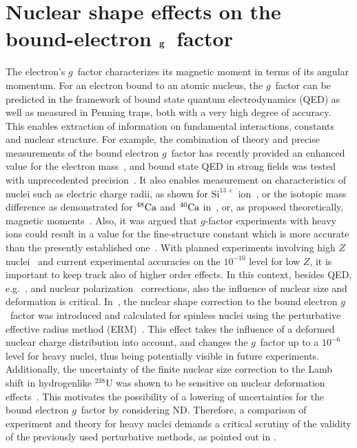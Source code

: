 \chapter{Nuclear shape effects on the bound-electron $\bf{g}$~factor}
\label{ch:nucl_def}
The electron's $g$~factor characterizes its magnetic moment in terms of its angular momentum. For an electron bound to an atomic nucleus, the $g$~factor can be predicted in the framework of bound state quantum electrodynamics (QED) as well as measured in Penning traps, both with a very high degree of accuracy. This enables extraction of information on fundamental interactions, constants and nuclear structure. For example, the combination of theory and precise measurements of the bound electron $g$~factor has recently provided an enhanced value for the electron mass~\cite{Sturm2014}, and bound state QED in strong fields was tested with unprecedented precision~\cite{Haffner2000, Verdu2004, Kohler2015, Zatorski2017}. It also enables measurement on characteristics of nuclei such as electric charge radii, as shown for $\textrm{Si}^{13+}$ ion~\cite{Sturm2011}, or the isotopic mass difference as demonstrated for $\null^{48} \textrm{Ca}$ and $\null^{40} \textrm{Ca}$ in~\cite{Kohler2016}, or, as proposed theoretically, magnetic moments~\cite{Yerokhin2011}.  Also, it was argued that $g$-factor experiments with heavy ions could result in a value for the fine-structure constant which is more accurate than the presently established one~\cite{Shabaev2006}.
With planned experiments involving high $Z$ nuclei~\cite{HITRAP2008,vogel2015} and current experimental accuracies on the $10^{-10}$ level for low $Z$, it is important to keep track also of higher order effects. In this context, besides QED, e.g.~\cite{Yerokhin2004,yerokhin2017,Pachucki2005, czarnecki2016,czarnecki2018}, and nuclear polarization~\cite{Nefiodov} corrections, also the influence of nuclear size and deformation is critical.
In~\cite{jacek2012}, the nuclear shape correction to the bound electron $g$~factor was introduced and calculated for spinless nuclei using the perturbative effective radius method (ERM)~\cite{Shabaev1993,kozhedub2008}. This effect takes the influence of a deformed nuclear charge distribution into account, and changes the $g$~factor up to a $10^{-6}$ level for heavy nuclei, thus being potentially visible in future experiments.
Additionally, the uncertainty of the finite nuclear size correction to the Lamb shift in hydrogenlike $^{238}$U was shown to be sensitive on nuclear deformation effects~\cite{kozhedub2008}.
This motivates the possibility of a lowering of uncertainties for the bound electron $g$~factor by considering ND.
Therefore, a comparison of experiment and theory for heavy nuclei demands a critical scrutiny of the validity of the previously used perturbative methods, as pointed out in \cite{karshenboim2018}.


